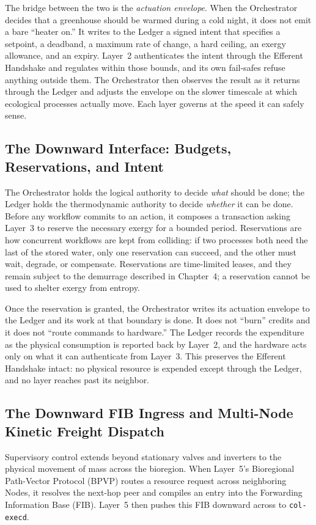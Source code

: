 The bridge between the two is the \textit{actuation envelope}. When the Orchestrator decides that a greenhouse should be warmed during a cold night, it does not emit a bare ``heater on.'' It writes to the Ledger a signed intent that specifies a setpoint, a deadband, a maximum rate of change, a hard ceiling, an exergy allowance, and an expiry. Layer~2 authenticates the intent through the Efferent Handshake and regulates within those bounds, and its own fail-safes refuse anything outside them. The Orchestrator then observes the result as it returns through the Ledger and adjusts the envelope on the slower timescale at which ecological processes actually move. Each layer governs at the speed it can safely sense.

\subsection{The Downward Interface: Budgets, Reservations, and Intent}

The Orchestrator holds the logical authority to decide \textit{what} should be done; the Ledger holds the thermodynamic authority to decide \textit{whether} it can be done. Before any workflow commits to an action, it composes a transaction asking Layer~3 to reserve the necessary exergy for a bounded period. Reservations are how concurrent workflows are kept from colliding: if two processes both need the last of the stored water, only one reservation can succeed, and the other must wait, degrade, or compensate. Reservations are time-limited leases, and they remain subject to the demurrage described in Chapter~4; a reservation cannot be used to shelter exergy from entropy.

Once the reservation is granted, the Orchestrator writes its actuation envelope to the Ledger and its work at that boundary is done. It does not ``burn'' credits and it does not ``route commands to hardware.'' The Ledger records the expenditure as the physical consumption is reported back by Layer~2, and the hardware acts only on what it can authenticate from Layer~3. This preserves the Efferent Handshake intact: no physical resource is expended except through the Ledger, and no layer reaches past its neighbor.

\subsection{The Downward FIB Ingress and Multi-Node Kinetic Freight Dispatch}

Supervisory control extends beyond stationary valves and inverters to the physical movement of mass across the bioregion. When Layer~5's Bioregional Path-Vector Protocol (BPVP) routes a resource request across neighboring Nodes, it resolves the next-hop peer and compiles an entry into the Forwarding Information Base (FIB). Layer~5 then pushes this FIB downward across  to \texttt{col-execd}.

